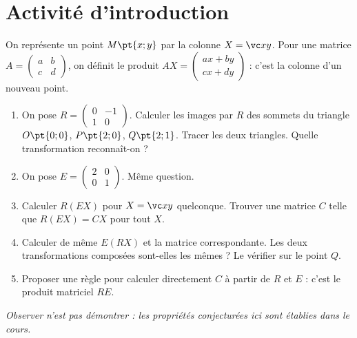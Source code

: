\mxnewpage
\section{Activité d'introduction}
\begin{activity}
On représente un point $M\pt{x;y}$ par la colonne $X=\vc xy$. Pour une matrice $A=\begin{pmatrix}a&b\\c&d\end{pmatrix}$, on définit le produit $AX=\begin{pmatrix}ax+by\\cx+dy\end{pmatrix}$ : c'est la colonne d'un nouveau point.
\begin{enumerate}
\item On pose $R=\begin{pmatrix}0&-1\\1&0\end{pmatrix}$. Calculer les images par $R$ des sommets du triangle $O\pt{0;0}$, $P\pt{2;0}$, $Q\pt{2;1}$. Tracer les deux triangles. Quelle transformation reconnaît-on ?
\item On pose $E=\begin{pmatrix}2&0\\0&1\end{pmatrix}$. Même question.
\item Calculer $R(EX)$ pour $X=\vc xy$ quelconque. Trouver une matrice $C$ telle que $R(EX)=CX$ pour tout $X$.
\item Calculer de même $E(RX)$ et la matrice correspondante. Les deux transformations composées sont-elles les mêmes ? Le vérifier sur le point $Q$.
\item Proposer une règle pour calculer directement $C$ à partir de $R$ et $E$ : c'est le produit matriciel $RE$.
\end{enumerate}
\par\emph{Observer n'est pas démontrer : les propriétés conjecturées ici sont établies dans le cours.}
\end{activity}
